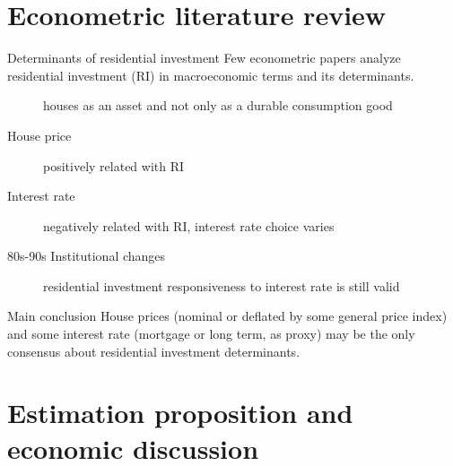 \documentclass[10pt]{beamer}
\begin{document}
\section{Econometric literature review}
\label{sec:org2dfb033}

\begin{frame}[label={sec:orgab2c35c}]{Determinants of residential investment}
Few econometric papers analyze residential investment (RI) in macroeconomic terms and its determinants.

\begin{description}
\item[{\textcite{poterba_tax_1984}}] houses as an asset and not only as a durable consumption good
\item[{House price}] positively related with RI
\item[{Interest rate}] negatively related with RI, interest rate choice varies
\item[{80s-90s Institutional changes}] residential investment responsiveness to interest rate is still valid
\end{description}

\begin{block}{Main conclusion}
House prices (nominal or deflated by some general price index) and some interest rate (mortgage or long term, as proxy) may be the only consensus about residential investment determinants.
\end{block}
\end{frame}



\section{Estimation proposition and economic discussion}
\label{sec:orgd7c9e9e}
\end{document}
